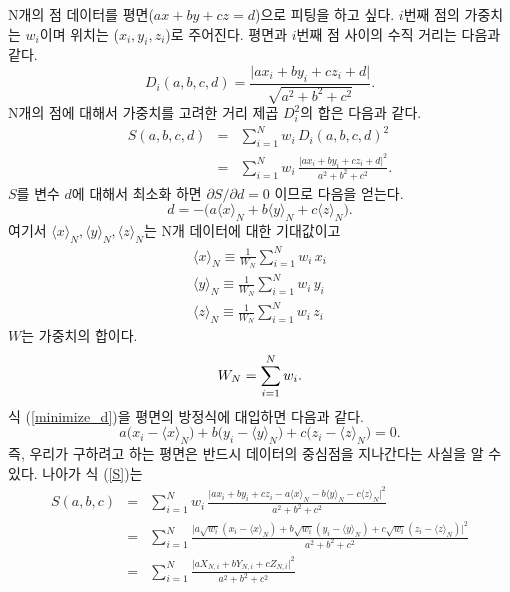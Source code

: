 \documentclass[chapter,a4paper,12pt]{oblivoir}
\begin{document}
N개의 점 데이터를 평면($ax+by+cz=d$)으로 피팅을 하고 싶다. $i$번째 점의 가중치는 $w_i$이며 위치는 ($x_i, y_i, z_i$)로 주어진다.
평면과 $i$번째 점 사이의 수직 거리는 다음과 같다.
\begin{equation}
D_i(a,b,c,d) = \frac{\vert ax_i + by_i + cz_i + d \vert}{\sqrt{a^2 + b^2 + c^2}}.
\end{equation}
N개의 점에 대해서 가중치를 고려한 거리 제곱 $D_i^2$의 합은 다음과 같다.
\begin{eqnarray} \label{S}
S(a,b,c,d) &=& \sum_{i=1}^N w_i\, D_i(a,b,c,d)^2 \\\nonumber
&=& \sum_{i=1}^N w_i\, \frac{\vert ax_i + by_i + cz_i + d \vert^2}{a^2 + b^2 + c^2}.
\end{eqnarray}
$S$를 변수 $d$에 대해서 최소화 하면 ${\partial S}/{\partial d} = 0$ 이므로 다음을 얻는다.
\begin{equation} \label{minimize_d}
d = -\Big(a\langle x \rangle_N + b\langle y \rangle_N + c\langle z \rangle_N\Big).
\end{equation}
여기서 $\langle x \rangle_N, \langle y \rangle_N, \langle z \rangle_N$는 N개 데이터에 대한 기대값이고
\begin{eqnarray} \label{expectation_value}
\langle x \rangle_N \equiv \frac{1}{W_N}\sum_{i=1}^N w_i\,x_i\\
\langle y \rangle_N \equiv \frac{1}{W_N}\sum_{i=1}^N w_i\,y_i\\
\langle z \rangle_N \equiv \frac{1}{W_N}\sum_{i=1}^N w_i\,z_i
\end{eqnarray}
$W$는 가중치의 합이다.
\begin{equation} \label{W}
W_N = \sum_{i=1}^N w_i. \\
\end{equation}
식 (\ref{minimize_d})을 평면의 방정식에 대입하면 다음과 같다.
\begin{equation}
a\big(x_i-\langle x \rangle_N\big) + b\big(y_i-\langle y \rangle_N\big) + c\big(z_i-\langle z \rangle_N\big) = 0.
\end{equation}
즉, 우리가 구하려고 하는 평면은 반드시 데이터의 중심점을 지나간다는 사실을 알 수 있다.
나아가 식 (\ref{S})는
\begin{eqnarray} \label{S2}
S(a,b,c) 
&=& \sum_{i=1}^N w_i\, \frac{\vert ax_i + by_i + cz_i - a\langle x \rangle_N - b\langle y \rangle_N - c\langle z \rangle_N \vert^2}{a^2 + b^2 + c^2} \\
&=& \sum_{i=1}^N \frac{\vert a \sqrt{w_i}(x_i-\langle x \rangle_N) + b \sqrt{w_i}(y_i-\langle y \rangle_N) + c \sqrt{w_i}(z_i-\langle z \rangle_N) \vert^2}{a^2 + b^2 + c^2} \nonumber\\
&=& \sum_{i=1}^N \frac{\vert aX_{N,i} + bY_{N,i} + cZ_{N,i} \vert^2}{a^2 + b^2 + c^2} \nonumber
\end{eqnarray}
\end{document}
